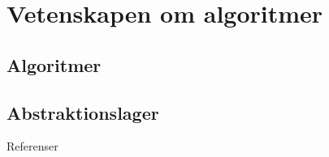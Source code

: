 \documentclass{beamer}
\begin{document}
\section{Vetenskapen om algoritmer}

\subsection{Algoritmer}
\begin{frame}{\insertsubsectionhead}
\end{frame}

\subsection{Abstraktionslager}
\begin{frame}{\insertsubsectionhead}
\end{frame}



\begin{frame}[allowframebreaks]{Referenser}
  \small
  \printbibliography
\end{frame}
\end{document}
